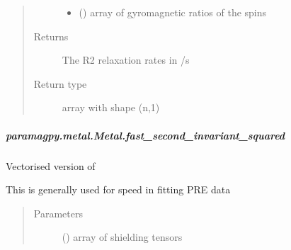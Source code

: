 \documentclass[a4paper,10pt,english,openany,oneside]{sphinxmanual}
\begin{document}
\begin{fulllineitems}
\begin{fulllineitems}
\begin{fulllineitems}
\begin{quote}
\begin{description}
\begin{itemize}
\item {} 
 (\sphinxstyleliteralemphasis{\sphinxupquote{ (}}\sphinxstyleliteralemphasis{\sphinxupquote{,}}\sphinxstyleliteralemphasis{\sphinxupquote{)}}) \textendash{} array of gyromagnetic ratios of the spins

\end{itemize}

\item[{Returns}] \leavevmode
{} \textendash{} The R2 relaxation rates in /s

\item[{Return type}] \leavevmode
array with shape (n,1)

\end{description}\end{quote}

\end{fulllineitems}



\subparagraph{paramagpy.metal.Metal.fast\_second\_invariant\_squared}
\label{\detokenize{reference/generated/paramagpy.metal.Metal.fast_second_invariant_squared:paramagpy-metal-metal-fast-second-invariant-squared}}\label{\detokenize{reference/generated/paramagpy.metal.Metal.fast_second_invariant_squared::doc}}

\begin{fulllineitems}
\label{\detokenize{reference/generated/paramagpy.metal.Metal.fast_second_invariant_squared:paramagpy.metal.Metal.fast_second_invariant_squared}}
Vectorised version of
{\hyperref[\detokenize{reference/generated/paramagpy.metal.Metal.second_invariant_squared:paramagpy.metal.Metal.second_invariant_squared}]{}}

This is generally used for speed in fitting PRE data
\begin{quote}\begin{description}
\item[{Parameters}] \leavevmode
{} (\sphinxstyleliteralemphasis{\sphinxupquote{ (}}\sphinxstyleliteralemphasis{\sphinxupquote{,}}\sphinxstyleliteralemphasis{\sphinxupquote{,}}\sphinxstyleliteralemphasis{\sphinxupquote{)}}) \textendash{} array of shielding tensors


\end{description}
\end{quote}
\end{fulllineitems}
\end{fulllineitems}
\end{fulllineitems}
\end{document}
